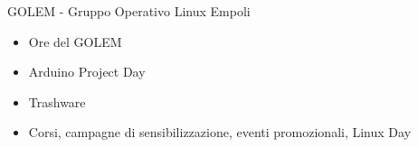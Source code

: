 \documentclass{beamer}
\begin{document}
\begin{frame}
\begin{block}{GOLEM - Gruppo Operativo Linux Empoli}
        \begin{minipage}{.55\linewidth}
            \begin{itemize} %
                \item Ore del GOLEM
                \item Arduino Project Day
                \item Trashware
                \item Corsi, campagne di sensibilizzazione, eventi promozionali, Linux Day
            \end{itemize}
        \end{minipage}
        \begin{minipage}{.3\linewidth}
        \end{minipage}
    \end{block}
\end{frame}
\end{document}
